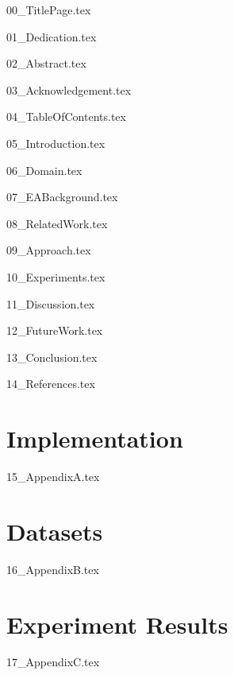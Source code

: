 \documentclass[version=last, pagesize=auto, paper=a4]{report}%
\numberwithin{equation}{section}
\begin{document}
{00_TitlePage.tex}

{01_Dedication.tex}

{02_Abstract.tex}

{03_Acknowledgement.tex}

{04_TableOfContents.tex}

{05_Introduction.tex}

\graphicspath{ {./Figures/06_Domain/} }
{06_Domain.tex}

\graphicspath{ {./Figures/07_EABackground/} }
{07_EABackground.tex}

{08_RelatedWork.tex}

\graphicspath{ {./Figures/09_Approach/} }
{09_Approach.tex}

\graphicspath{ {./Figures/10_Experiments/} }
{10_Experiments.tex}

{11_Discussion.tex}

{12_FutureWork.tex}

{13_Conclusion.tex}

{14_References.tex}

\newpage
\begin{appendices}
    \chapter{Implementation}
        {15_AppendixA.tex}
    \chapter{Datasets}
        {16_AppendixB.tex}
    \chapter{Experiment Results}
	    {17_AppendixC.tex}
\end{appendices}
\end{document}
